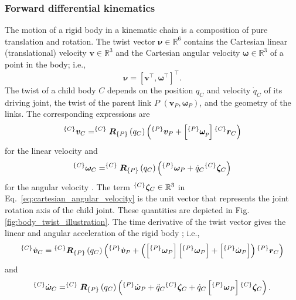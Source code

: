 \subsubsection{Forward differential kinematics}
The motion of a rigid body in a kinematic chain is a composition of pure translation and rotation. The twist vector $\bm{\nu}\in \mathbb{R}^6$ contains the Cartesian linear (translational) velocity $\bm{v}\in \mathbb{R}^3$ and the Cartesian angular velocity $\bm{\omega}\in \mathbb{R}^3$ of a point in the body; i.e., 
\begin{equation*}
	\bm{\nu} = \left[\bm{v}^\intercal, \bm{\omega}^\intercal\right]^\intercal.
\end{equation*}
The twist of a child body $C$ depends on the position $q_C$ and velocity $\dot{q}_C$ of its driving joint, the twist of the parent link $P$ $\left(\bm{v}_P,\bm{\omega}_P\right)$, and the geometry of the links. The corresponding expressions are
\begin{equation}\label{eq:cartesian_linear_velocity}
	^{\left\lbrace C \right\rbrace}\bm{v}_C = ^{\left\lbrace C \right\rbrace}\bm{R}_{\left\lbrace P \right\rbrace}\left(q_C\right)\left(^{\left\lbrace P \right\rbrace}\bm{v}_P + \left[^{\left\lbrace P \right\rbrace}\bm{\omega}_p\right] {}^{\left\lbrace C \right\rbrace}\bm{r}_C\right)
\end{equation}
for the linear velocity and 
\begin{equation}\label{eq:cartesian_angular_velocity}
	^{\left\lbrace C \right\rbrace}\bm{\omega}_C = ^{\left\lbrace C \right\rbrace}\bm{R}_{\left\lbrace P \right\rbrace}\left(q_C\right)\left(^{\left\lbrace P \right\rbrace}\bm{\omega}_P + \dot{q}_C{}^{\left\lbrace C \right\rbrace}\bm{\zeta}_C\right)
\end{equation}
for the angular velocity \cite{Featherstone2007RigidBodyDynamics}. The term $^{\left\lbrace C \right\rbrace}\bm{\zeta}_C \in \mathbb{R}^3$ in Eq.~\eqref{eq:cartesian_angular_velocity} is the unit vector that represents the joint rotation axis of the child joint. These quantities are depicted in Fig.~	\ref{fig:body_twist_illustration}. The time derivative of the twist vector gives the linear and angular acceleration of the rigid body \cite{Siciliano2008RoboticsModellingPlanning}; i.e.,
\begin{equation}\label{eq:cartesian_linear_acceleration}
	^{\left\lbrace C \right\rbrace}\dot{\bm{v}}_C = {}^{\left\lbrace C \right\rbrace}\bm{R}_{\left\lbrace P \right\rbrace}\left(q_C\right)\left(^{\left\lbrace P \right\rbrace}\dot{\bm{v}}_P + \left(\left[^{\left\lbrace P \right\rbrace}\bm{\omega}_P\right]\left[^{\left\lbrace P \right\rbrace}\bm{\omega}_P\right] + \left[^{\left\lbrace P \right\rbrace}\dot{\bm{\omega}}_P\right]\right) {}^{\left\lbrace P \right\rbrace}\bm{r}_C\right) 
\end{equation}    
and
\begin{equation}\label{eq:cartesian_angular_acceleration}
	^{\left\lbrace C \right\rbrace}\dot{\bm{\omega}}_C = ^{\left\lbrace C \right\rbrace}\bm{R}_{\left\lbrace P \right\rbrace}\left(q_C\right)\left(^{\left\lbrace P \right\rbrace}\dot{\bm{\omega}}_P + \ddot{q}_C{}^{\left\lbrace C \right\rbrace}\bm{\zeta}_C + \dot{q}_C\left[^{\left\lbrace P \right\rbrace}\bm{\omega}_P\right]{}^{\left\lbrace C \right\rbrace}\bm{\zeta}_C\right).
\end{equation}

